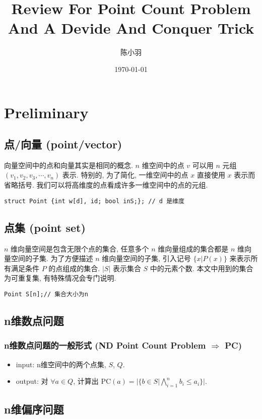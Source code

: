 \documentclass[11pt]{article}
\author{陈小羽}
\date{\today}
\title{Review For Point Count Problem And A Devide And Conquer Trick}
\begin{document}
\maketitle
\tableofcontents


\section{Preliminary}
\label{sec:org9919e1b}
\subsection{点/向量 (point/vector)}
\label{sec:org91114b1}
向量空间中的点和向量其实是相同的概念.
\(n\) 维空间中的点 \(v\) 可以用 \(n\) 元组 \((v_1, v_2, v_3, \cdots, v_n)\) 表示.
特别的, 为了简化, 一维空间中的点 \(x\) 直接使用 \(x\) 表示而省略括号.
我们可以将高维度的点看成许多一维空间中的点的元组.
\begin{verbatim}
struct Point {int w[d], id; bool inS;}; // d 是维度
\end{verbatim}
\subsection{点集 (point set)}
\label{sec:orgd7b728b}
\(n\) 维向量空间是包含无限个点的集合, 任意多个 \(n\) 维向量组成的集合都是 \(n\) 维向量空间的子集.
为了方便描述 \(n\) 维向量空间的子集, 引入记号 \(\{ x | P(x)\}\) 来表示所有满足条件 \(P\) 的点组成的集合.
\(|S|\) 表示集合 \(S\) 中的元素个数. 本文中用到的集合为可重复集, 有特殊情况会专门说明.
\begin{verbatim}
Point S[n];// 集合大小为n
\end{verbatim}
\subsection{n维数点问题}
\label{sec:org6717686}
\subsubsection{n维数点问题的一般形式 (ND Point Count Problem \(\Rightarrow\) PC)}
\label{sec:org6759e65}
\begin{itemize}
\item input: n维空间中的两个点集, \(S\), \(Q\).
\item output: 对 \(\forall a \in Q\), 计算出 \(\mbox{PC}(a) = |\{ b\in S| \bigwedge_{i=1}^n b_i\leq a_i\}|\).
\end{itemize}
\subsection{n维偏序问题}
\label{sec:orge3451bb}
\end{document}
